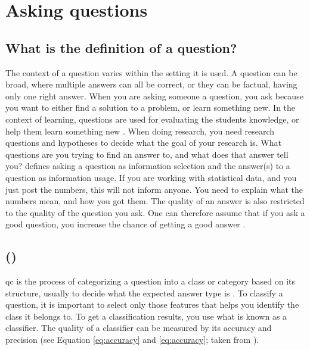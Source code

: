 \section{Asking questions}
\label{sec:asking_questions}

\subsection{What is the definition of a question?}
\label{sec:question_definition}
The context of a question varies within the setting it is used. 
A question can be broad, where multiple answers can all be correct, or they can be factual, having only one right answer. 
When you are asking someone a question, you ask because you want to either find a solution to a problem, or learn something new. 
In the context of learning, questions are used for evaluating the students knowledge, or help them learn something new \textcite{Nielsen2008}.
\vspace{0.5em}\newline
When doing research, you need research questions and hypotheses to decide what the goal of your research is. 
What questions are you trying to find an answer to, and what does that answer tell you?
\textcite{Slowiaczek1992} defines asking a question as information selection and the answer(s) to a question as information usage. 
If you are working with statistical data, and you just post the numbers, this will not inform anyone. 
You need to explain what the numbers mean, and how you got them.
The quality of an answer is also restricted to the quality of the question you ask. 
One can therefore assume that if you ask a good question, you increase the chance of getting a good answer \cite{Slowiaczek1992}. 

\subsection[Question classification]{ ()}
\label{sec:question_classification}
\gls{qc} is the process of categorizing a question into a class or category based on its structure, usually to decide what the expected answer type is \cite{Li, Loni2011, Lopez2011}. 
To classify a question, it is important to select only those features that helps you identify the class it belongs to.
To get a classification results, you use what is known as a classifier. 
The quality of a classifier can be measured by its accuracy and precision (see Equation \ref{eq:accuracy} and \ref{eq:accuracy}; taken from \cite[p.~13]{Li}).

